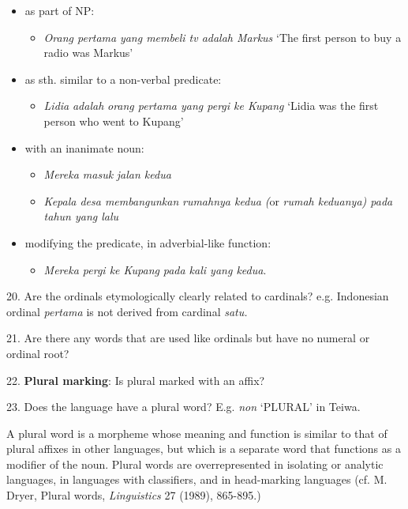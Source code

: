 \begin{itemize}
\item as part of NP: 

\begin{itemize}
\item \textit{Orang pertama}\textit{ yang membeli tv adalah Markus }{\textquoteleft}The first person to buy a radio was Markus{\textquoteright}  
\end{itemize}
\item as sth. similar to a non-verbal predicate: 

\begin{itemize}
\item \textit{Lidia }\textit{adalah}\textit{ }\textit{orang pertama yang pergi ke Kupang}\textit{ }{\textquoteleft}Lidia was the first person who went to Kupang{\textquoteright} 
\end{itemize}
\item with an inanimate noun: 

\begin{itemize}
\item \textit{Mereka masuk }\textit{jalan kedua}
\item \textit{Kepala desa membangunkan }\textit{rumahnya kedua}\textit{ (}or\textit{ }\textit{rumah keduanya}\textit{) pada tahun yang lalu  }
\end{itemize}
\item modifying the predicate, in adverbial-like function: 

\begin{itemize}
\item \textit{Mereka pergi ke Kupang }\textit{pada kali yang kedua}.
\end{itemize}
\end{itemize}
20. Are the ordinals etymologically clearly related to cardinals? e.g. Indonesian ordinal \textit{pertama} is not derived from cardinal \textit{satu.}

21. Are there any words that are used like ordinals but have no numeral or ordinal root?

22. \textbf{Plural marking}: Is plural marked with an affix? 

23. Does the language have a plural word? E.g. \textit{non }{\textquoteleft}PLURAL{\textquoteright} in Teiwa.

A plural word is a morpheme whose meaning and function is similar to that of plural affixes in other languages, but which is a separate word that functions as a modifier of the noun.  Plural words are overrepresented in isolating or analytic languages, in languages with classifiers, and in head-marking languages (cf. M. Dryer, Plural words, \textit{Linguistics }27 (1989), 865-895.)

